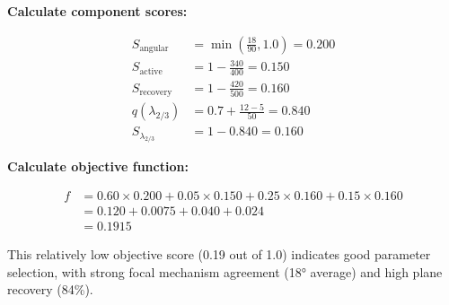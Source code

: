 \documentclass[11pt,a4paper]{article}
\begin{document}
\textbf{Calculate component scores:}

\begin{align*}
S_{\text{angular}} &= \min\left(\frac{18}{90}, 1.0\right) = 0.200 \\
S_{\text{active}} &= 1 - \frac{340}{400} = 0.150 \\
S_{\text{recovery}} &= 1 - \frac{420}{500} = 0.160 \\
q(\lambda_{2/3}) &= 0.7 + \frac{12 - 5}{50} = 0.840 \\
S_{\lambda_{2/3}} &= 1 - 0.840 = 0.160
\end{align*}

\textbf{Calculate objective function:}

\begin{align*}
f &= 0.60 \times 0.200 + 0.05 \times 0.150 + 0.25 \times 0.160 + 0.15 \times 0.160 \\
  &= 0.120 + 0.0075 + 0.040 + 0.024 \\
  &= \mathbf{0.1915}
\end{align*}

This relatively low objective score (0.19 out of 1.0) indicates good parameter selection, with strong focal mechanism agreement (18° average) and high plane recovery (84\%).
\end{document}
